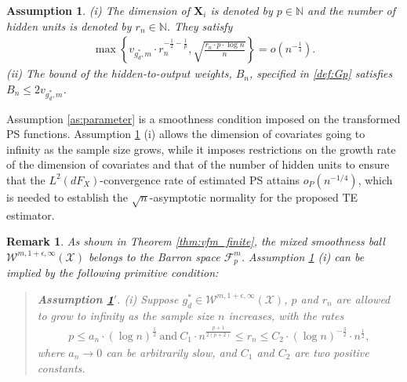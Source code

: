 \documentclass[11pt]{article}
\newtheorem{rk}{Remark}
\newtheorem{assumption}[]{Assumption}
\numberwithin{equation}{section}
\begin{document}
\begin{assumption}\label{as:rate_rp}  (i) The dimension of $\boldsymbol{X}_{i}$ is  denoted by $p\in\mathbb{N}$ and the number of hidden units is denoted by $r_n\in\mathbb{N}$. They satisfy
	\begin{align*}
\max\left\{v_{g_d^*,m}\cdot r_n^{-\frac{1}{2}-\frac{1}{p}},\sqrt{\frac{r_n\cdot p\cdot \log n}{n}}\right\}=o\left(n^{-\frac{1}{4}}\right).
	\end{align*}
 (ii) The bound of the hidden-to-output weights, $B_n$, specified in \eqref{def:Gp} satisfies  $B_n\leq 2v_{g_d^*,m}$.
\end{assumption}
Assumption  \ref{as:parameter}  is a smoothness condition imposed on the transformed PS functions. Assumption \ref{as:rate_rp} (i) allows the dimension of covariates going to infinity as the sample size grows, while it imposes restrictions on the growth rate of the dimension of covariates and that of the number of hidden units to ensure that the $L^2(dF_X)$-convergence rate of estimated PS attains $o_P(n^{-1/4})$, which is needed to establish the $\sqrt{n}$-asymptotic normality for the proposed TE estimator.
	
\begin{rk}
 As shown in Theorem \ref{thm:vfm_finite}, the mixed smoothness ball $\mathcal{W}^{m,1+\epsilon,\infty}(\mathcal{X})$ belongs to the Barron space $\mathcal{F}_p^m$.  Assumption \ref{as:rate_rp} (i) can be implied by the following  primitive condition:
	\begin{quote} 	\noindent \textbf{Assumption \ref{as:rate_rp}$'$}. (i) Suppose $g_d^*\in\mathcal{W}^{m,1+\epsilon,\infty}(\mathcal{X})$,  $p$ and $r_n$ are allowed to grow to infinity as the sample size $n$ increases, with the rates
		\begin{align*}
			p\leq a_n\cdot\left(\log n\right)^{\frac{1}{2}}\ \text{and} \  C_1\cdot n^{\frac{p+1}{2(p+2)}}\leq r_n \leq C_2\cdot (\log n)^{-\frac{3}{2}}\cdot n^{\frac{1}{2}},
		\end{align*}
		where $a_n\to 0$ can be arbitrarily slow, and $C_1$ and $C_2$ are two positive constants.
	\end{quote}
\end{rk}
\end{document}
